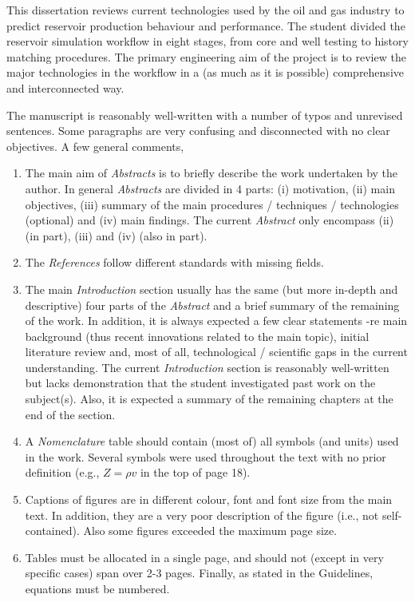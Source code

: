 \documentclass[14pt,twoside]{report}
\begin{document}
\medskip

This dissertation reviews current technologies used by the oil and gas industry to predict reservoir production behaviour and performance. The student divided the reservoir simulation workflow in eight stages, from core and well testing to history matching procedures. The primary engineering aim of the project is to review the major technologies in the workflow in a (as much as it is possible) comprehensive and interconnected way. 

The manuscript is reasonably well-written with a number of typos and unrevised sentences. Some paragraphs are very confusing and disconnected with no clear objectives. A few general comments,
\begin{enumerate}
\item The main aim of {\it Abstracts} is to briefly describe the work undertaken by the author. In general {\it Abstracts} are divided in 4 parts: (i) motivation, (ii) main objectives, (iii) summary of the main procedures / techniques / technologies (optional) and (iv) main findings. The current {\it Abstract} only encompass (ii) (in part), (iii) and (iv) (also in part).
\item The {\it References} follow different standards with missing fields.
\item The main {\it Introduction} section usually has the same (but more in-depth and descriptive) four parts of the {\it Abstract} and a brief summary of the remaining of the work. In addition, it is always expected a few clear statements -re main background (thus recent innovations related to the main topic), initial literature review and, most of all, technological / scientific gaps in the current understanding. The current {\it Introduction} section is reasonably well-written but lacks demonstration that the student investigated past work on the subject(s). Also, it is expected a summary of the remaining chapters at the end of the section.
\item A {\it Nomenclature} table should contain (most of) all symbols (and units) used in the work. Several symbols were used throughout the text with no prior definition (e.g., $Z=\rho v$ in the top of page 18).
\item Captions of figures are in different colour, font and font size from the main text. In addition, they are a very poor description of the figure (i.e., not self-contained). Also some figures exceeded the maximum page size.
\item Tables must be allocated in a single page, and should not (except in very specific cases) span over 2-3 pages. Finally, as stated in the Guidelines, equations must be numbered.

\end{enumerate}
\end{document}
